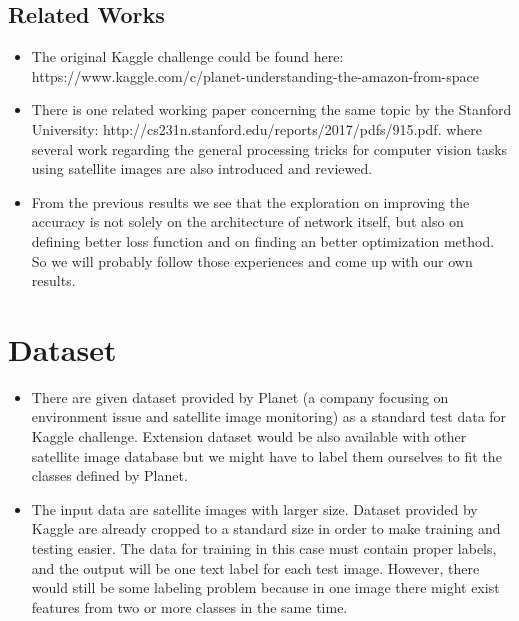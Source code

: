 \documentclass[10pt,twocolumn,letterpaper]{article}
\begin{document}
    \subsection{Related Works}
        \begin{itemize}
            \item{
                The original Kaggle challenge could be found here:
                https://www.kaggle.com/c/planet-understanding-the-amazon-from-space
            }
            \item{
                There is one related working paper concerning the same topic
                by the Stanford University:
                http://cs231n.stanford.edu/reports/2017/pdfs/915.pdf.
                where several work regarding
                the general processing tricks for computer vision tasks
                using satellite images are also introduced and reviewed.
            }
            \item{
                From the previous results
                we see that the exploration on improving the accuracy
                is not solely on the architecture of network itself,
                but also on defining better loss function
                and on finding an better optimization method.
                So we will probably follow those experiences
                and come up with our own results.
            }
        \end{itemize}

\section{Dataset}
    \begin{itemize}
        \item {
            There are given dataset provided by Planet (a company focusing on environment issue
            and satellite image monitoring) as a standard test data for Kaggle challenge.
            Extension dataset would be also available with other satellite image database
            but we might have to label them ourselves to fit the classes defined by Planet.
        }
        \item {
            The input data are satellite images with larger size.
            Dataset provided by Kaggle are already cropped to a standard size
            in order to make training and testing easier.
            The data for training in this case must contain proper labels,
            and the output will be one text label for each test image.
            However, there would still be some labeling problem
            because in one image there might exist 
            features from two or more classes in the same time.
        }
    \end{itemize}
\end{document}
